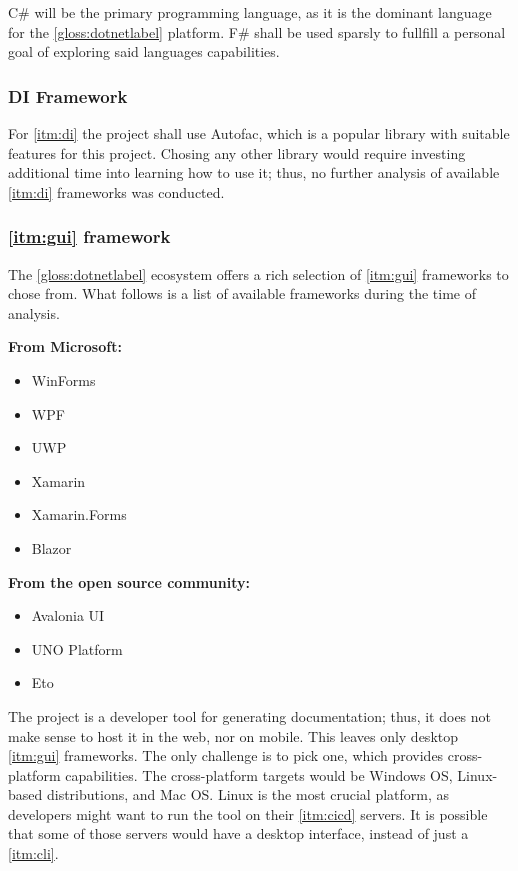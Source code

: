 C\# will be the primary programming language, as it is the dominant language for the \ref{gloss:dotnetlabel} platform.
F\# shall be used sparsly to fullfill a personal goal of exploring said languages capabilities.

\subsubsection{DI Framework}

For \ref{itm:di} the project shall use Autofac, which is a popular library with suitable features for this project. Chosing any other library would require investing additional time into learning how to use it; thus, no further analysis of available \ref{itm:di} frameworks was conducted.

\subsubsection{\ref{itm:gui} framework}

The \ref{gloss:dotnetlabel} ecosystem offers a rich selection of \ref{itm:gui} frameworks to chose from. What follows is a list of available frameworks during the time of analysis.

\textbf{From Microsoft:}
\begin{itemize}
    \item WinForms
    \item WPF
    \item UWP
    \item Xamarin
    \item Xamarin.Forms
    \item Blazor
\end{itemize}

\textbf{From the open source community:}
\begin{itemize}
    \item Avalonia UI
    \item UNO Platform
    \item Eto
\end{itemize}

The project is a developer tool for generating documentation; thus, it does not make sense to host it in the web, nor on mobile. This leaves only desktop \ref{itm:gui} frameworks. The only challenge is to pick one, which provides cross-platform capabilities. The cross-platform targets would be Windows OS, Linux-based distributions, and Mac OS.
Linux is the most crucial platform, as developers might want to run the tool on their \ref{itm:cicd} servers. It is possible that some of those servers would have a desktop interface, instead of just a \ref{itm:cli}.

